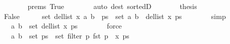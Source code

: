 \begin{isabellebody}
\ \ \ \ \ \ \isamarkupfalse%
\ {\isachardoublequoteopen}{}{\isachardot}{\kern0pt}prems{\isachardoublequoteclose}\ True\isanewline
\ \ \ \ \ \ \isamarkupfalse%
\ {\isacharparenleft}{\kern0pt}auto\ dest{\isacharcolon}{\kern0pt}\ sorted{}D{\isacharparenright}{\kern0pt}\isanewline
\ \ \ \ \isamarkupfalse%
\ \isamarkupfalse%
\ {\isacharquery}{\kern0pt}thesis\isanewline
\ \ \ \ \ \ \isacommand{{\isachardot}{\kern0pt}}\isamarkupfalse%
\isanewline
\ \ \isamarkupfalse%
\isanewline
\ \ \ \ \isamarkupfalse%
\ False\isanewline
\ \ \ \ \isamarkupfalse%
\ {\isachardoublequoteopen}set\ {\isacharparenleft}{\kern0pt}del{\isacharunderscore}{\kern0pt}list\ x\ {\isacharparenleft}{\kern0pt}{\isacharparenleft}{\kern0pt}a{\isacharcomma}{\kern0pt}\ b{\isacharparenright}{\kern0pt}\ {\isacharhash}{\kern0pt}\ ps{\isacharparenright}{\kern0pt}{\isacharparenright}{\kern0pt}\ {\isacharequal}{\kern0pt}\ set\ {\isacharparenleft}{\kern0pt}{\isacharparenleft}{\kern0pt}a{\isacharcomma}{\kern0pt}\ b{\isacharparenright}{\kern0pt}\ {\isacharhash}{\kern0pt}\ del{\isacharunderscore}{\kern0pt}list\ x\ ps{\isacharparenright}{\kern0pt}{\isachardoublequoteclose}\isanewline
\ \ \ \ \ \ \isamarkupfalse%
\ simp\isanewline
\ \ \ \ \isamarkupfalse%
\ \isamarkupfalse%
\ {\isachardoublequoteopen}{\isachardot}{\kern0pt}{\isachardot}{\kern0pt}{\isachardot}{\kern0pt}\ {\isacharequal}{\kern0pt}\ {\isacharbraceleft}{\kern0pt}{\isacharparenleft}{\kern0pt}a{\isacharcomma}{\kern0pt}\ b{\isacharparenright}{\kern0pt}{\isacharbraceright}{\kern0pt}\ {\isasymunion}\ set\ {\isacharparenleft}{\kern0pt}del{\isacharunderscore}{\kern0pt}list\ x\ ps{\isacharparenright}{\kern0pt}{\isachardoublequoteclose}\isanewline
\ \ \ \ \ \ \isamarkupfalse%
\ force\isanewline
\ \ \ \ \isamarkupfalse%
\ \isamarkupfalse%
\ {\isachardoublequoteopen}{\isachardot}{\kern0pt}{\isachardot}{\kern0pt}{\isachardot}{\kern0pt}\ {\isacharequal}{\kern0pt}\ {\isacharbraceleft}{\kern0pt}{\isacharparenleft}{\kern0pt}a{\isacharcomma}{\kern0pt}\ b{\isacharparenright}{\kern0pt}{\isacharbraceright}{\kern0pt}\ {\isasymunion}\ set\ ps\ {\isacharminus}{\kern0pt}\ set\ {\isacharparenleft}{\kern0pt}filter\ {\isacharparenleft}{\kern0pt}{\isasymlambda}p{\isachardot}{\kern0pt}\ fst\ p\ {\isacharequal}{\kern0pt}\ x{\isacharparenright}{\kern0pt}\ ps{\isacharparenright}{\kern0pt}{\isachardoublequoteclose}\isanewline
\ \ \ \ \ \ \isamarkupfalse%

\end{isabellebody}
